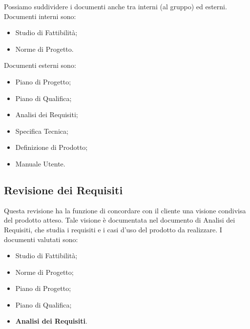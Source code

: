\documentclass[a4paper]{article}
\begin{document}
		
Possiamo suddividere i documenti anche tra interni (al gruppo) ed esterni. Documenti interni sono:
		
	\begin{itemize}
		
			
	\item Studio di Fattibilità;
			
	\item Norme di Progetto.
		
	\end{itemize}

		
Documenti esterni sono:
		
	\begin{itemize}
		
			
	\item Piano di Progetto;
			
	\item Piano di Qualifica;
			
	\item Analisi dei Requisiti;
			
	\item Specifica Tecnica;
			
	\item Definizione di Prodotto;
			
	\item Manuale Utente.
		
	\end{itemize}


		
	\subsection{Revisione dei Requisiti}

		
Questa revisione ha la funzione di concordare con il cliente una visione condivisa del prodotto atteso. Tale visione è documentata nel documento di Analisi dei Requisiti, che studia i requisiti e i casi d'uso del prodotto da realizzare. I documenti valutati sono:
		
	\begin{itemize}
		
			
	\item Studio di Fattibilità;
			
	\item Norme di Progetto;
			
	\item Piano di Progetto;
			
	\item Piano di Qualifica;
			
	\item \textbf{Analisi dei Requisiti}.
		
	\end{itemize}
\end{document}
